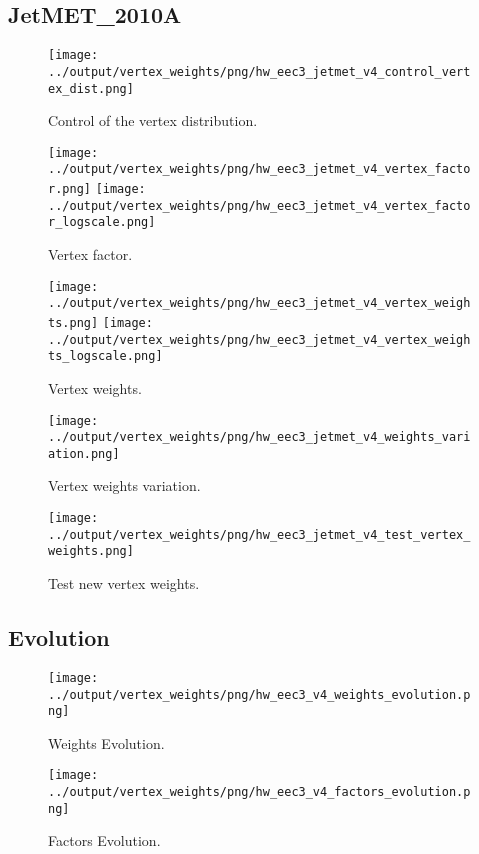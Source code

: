 \documentclass[11pt]{book}
\begin{document}
\subsection{JetMET\_2010A}
\begin{figure}[ht]
\centering
\texttt{[image: ../output/vertex\_weights/png/hw\_eec3\_jetmet\_v4\_control\_vertex\_dist.png]}
\caption{Control of the vertex distribution.}
\end{figure}

\begin{figure}[ht]
\centering
\texttt{[image: ../output/vertex\_weights/png/hw\_eec3\_jetmet\_v4\_vertex\_factor.png]}
\texttt{[image: ../output/vertex\_weights/png/hw\_eec3\_jetmet\_v4\_vertex\_factor\_logscale.png]}
\caption{Vertex factor.}
\end{figure}

\begin{figure}[ht]
\centering
\texttt{[image: ../output/vertex\_weights/png/hw\_eec3\_jetmet\_v4\_vertex\_weights.png]}
\texttt{[image: ../output/vertex\_weights/png/hw\_eec3\_jetmet\_v4\_vertex\_weights\_logscale.png]}
\caption{Vertex weights.}
\end{figure}

\begin{figure}[ht]
\centering
\texttt{[image: ../output/vertex\_weights/png/hw\_eec3\_jetmet\_v4\_weights\_variation.png]}
\caption{Vertex weights variation.}
\end{figure}

\begin{figure}[ht]
\centering
\texttt{[image: ../output/vertex\_weights/png/hw\_eec3\_jetmet\_v4\_test\_vertex\_weights.png]}
\caption{Test new vertex weights.}
\end{figure}
\clearpage

\subsection{Evolution}
\begin{figure}[ht]
\centering
\texttt{[image: ../output/vertex\_weights/png/hw\_eec3\_v4\_weights\_evolution.png]}
\caption{Weights Evolution.}
\end{figure}


\begin{figure}[ht]
\centering
\texttt{[image: ../output/vertex\_weights/png/hw\_eec3\_v4\_factors\_evolution.png]}
\caption{Factors Evolution.}
\end{figure}
\end{document}
